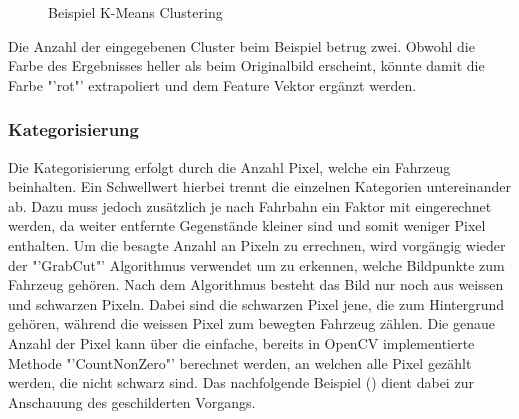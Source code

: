 {\begin{figure}[H]
  \centering
  \caption{Beispiel K-Means Clustering}
  \label{bClustering}
\end{figure}

Die Anzahl der eingegebenen Cluster beim Beispiel betrug zwei. Obwohl die Farbe des Ergebnisses heller als beim Originalbild erscheint, könnte damit die Farbe "'rot"' extrapoliert und dem Feature Vektor ergänzt werden. \cite{GrabCut, Clustering}

\subsubsection{Kategorisierung}
Die Kategorisierung erfolgt durch die Anzahl Pixel, welche ein Fahrzeug beinhalten. Ein Schwellwert hierbei trennt die einzelnen Kategorien untereinander ab. Dazu muss jedoch zusätzlich je nach Fahrbahn ein Faktor mit eingerechnet werden, da weiter entfernte Gegenstände kleiner sind und somit weniger Pixel enthalten. Um die besagte Anzahl an Pixeln zu errechnen, wird vorgängig wieder der "'GrabCut"' Algorithmus verwendet um zu erkennen, welche Bildpunkte zum Fahrzeug gehören. Nach dem Algorithmus besteht das Bild nur noch aus weissen und schwarzen Pixeln. Dabei sind die schwarzen Pixel jene, die zum Hintergrund gehören, während die weissen Pixel zum bewegten Fahrzeug zählen. Die genaue Anzahl der Pixel kann über die einfache, bereits in OpenCV implementierte Methode "'CountNonZero"' berechnet werden, an welchen alle Pixel gezählt werden, die nicht schwarz sind. Das nachfolgende Beispiel () dient dabei zur Anschauung des geschilderten Vorgangs.

}
